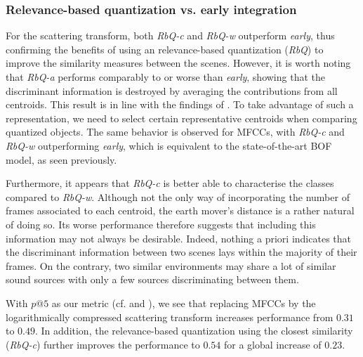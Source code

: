 \documentclass[smallextended]{svjour3}
\makeatletter
\newcommand*{\vs}{vs.\@\xspace}
\makeatother
\begin{document}
\subsubsection*{Relevance-based quantization \vs early integration}

For the scattering transform, both \emph{RbQ-c} and \emph{RbQ-w} outperform \emph{early}, thus confirming the benefits of using an relevance-based quantization (\emph{RbQ}) to improve the similarity measures between the scenes. However, it is worth noting that \emph{RbQ-a} performs comparably to or worse than \emph{early}, showing that the discriminant information is destroyed by averaging the contributions from all centroids. This result is in line with the findings of \cite{lagrange:hal-01082501}. To take advantage of such a representation, we need to select certain representative centroids when comparing quantized objects. The same behavior is observed for MFCCs, with \emph{RbQ-c} and \emph{RbQ-w} outperforming \emph{early}, which is equivalent to the state-of-the-art BOF model, as seen previously.

Furthermore, it appears that \emph{RbQ-c} is better able to characterise the classes compared to \emph{RbQ-w}. Although not the only way of incorporating the number of frames associated to each centroid, the earth mover's distance is a rather natural of doing so. Its worse performance therefore suggests that including this information may not always be desirable. Indeed, nothing a priori indicates that the discriminant information between two scenes lays within the majority of their frames. On the contrary, two similar environments may share a lot of similar sound sources with only a few sources discriminating between them.

With $p@5$ as our metric (cf. \cite{aucouturier2007bag} and \cite{lagrange:hal-01082501}), we see that replacing MFCCs by the logarithmically compressed scattering transform increases performance from $0.31$ to $0.49$. In addition, the relevance-based quantization using the closest similarity (\emph{RbQ-c}) further improves the performance to $0.54$ for a global increase of $0.23$.
\end{document}
